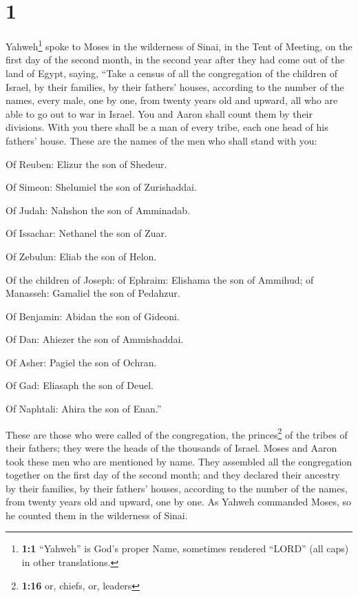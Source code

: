 \hypertarget{section}{%
\section{1}\label{section}}

 Yahweh\footnote{\textbf{1:1} ``Yahweh'' is God's proper
  Name, sometimes rendered ``LORD'' (all caps) in other translations.}
spoke to Moses in the wilderness of Sinai, in the Tent of Meeting, on
the first day of the second month, in the second year after they had
come out of the land of Egypt, saying,  ``Take a census of
all the congregation of the children of Israel, by their families, by
their fathers' houses, according to the number of the names, every male,
one by one,  from twenty years old and upward, all who are
able to go out to war in Israel. You and Aaron shall count them by their
divisions.  With you there shall be a man of every tribe,
each one head of his fathers' house.  These are the names
of the men who shall stand with you:

Of Reuben: Elizur the son of Shedeur.

 Of Simeon: Shelumiel the son of Zurishaddai.

 Of Judah: Nahshon the son of Amminadab.

 Of Issachar: Nethanel the son of Zuar.

 Of Zebulun: Eliab the son of Helon.

 Of the children of Joseph: of Ephraim: Elishama the son
of Ammihud; of Manasseh: Gamaliel the son of Pedahzur.

 Of Benjamin: Abidan the son of Gideoni.

 Of Dan: Ahiezer the son of Ammishaddai.

 Of Asher: Pagiel the son of Ochran.

 Of Gad: Eliasaph the son of Deuel.

 Of Naphtali: Ahira the son of Enan.''

 These are those who were called of the congregation, the
princes\footnote{\textbf{1:16} or, chiefs, or, leaders} of the tribes of
their fathers; they were the heads of the thousands of Israel.
 Moses and Aaron took these men who are mentioned by
name.  They assembled all the congregation together on
the first day of the second month; and they declared their ancestry by
their families, by their fathers' houses, according to the number of the
names, from twenty years old and upward, one by one.  As
Yahweh commanded Moses, so he counted them in the wilderness of Sinai.


